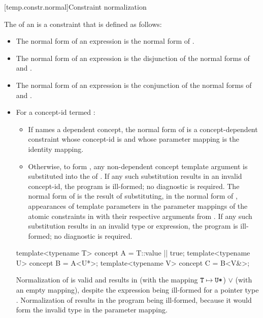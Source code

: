 [temp.constr.normal]{Constraint normalization}
%

\pnum
The  of an   is
a constraint that is defined as follows:
%
\begin{itemize}
\item
The normal form of an expression  is
the normal form of .

\item
The normal form of an expression  is
the disjunction of
the normal forms of  and .

\item
The normal form of an expression 
is the conjunction of
the normal forms of  and .

\item
For a concept-id  termed :
\begin{itemize}
\item
If  names a dependent concept,
the normal form of  is a concept-dependent constraint
whose concept-id is  and
whose parameter mapping is the identity mapping.
\item
Otherwise, to form ,
any non-dependent concept template argument 
is substituted into the  of .
If any such substitution results in an invalid concept-id,
the program is ill-formed; no diagnostic is required.
The normal form of  is the result of substituting,
in the normal form  of ,
appearances of  template parameters
in the parameter mappings of the atomic constraints in 
with their respective arguments from .
If any such substitution results in an invalid type or expression,
the program is ill-formed; no diagnostic is required.
\end{itemize}
\begin{example}
\begin{codeblock}
template<typename T> concept A = T::value || true;
template<typename U> concept B = A<U*>;
template<typename V> concept C = B<V&>;
\end{codeblock}
Normalization of  
is valid and results in
 (with the mapping $\texttt{\protect T} \mapsto \texttt{\protect U*}$)
$\lor$
 (with an empty mapping),
despite the expression  being ill-formed
for a pointer type .
Normalization of  
results in the program being ill-formed,
because it would form the invalid type 
in the parameter mapping.
\end{example}


\end{itemize}
